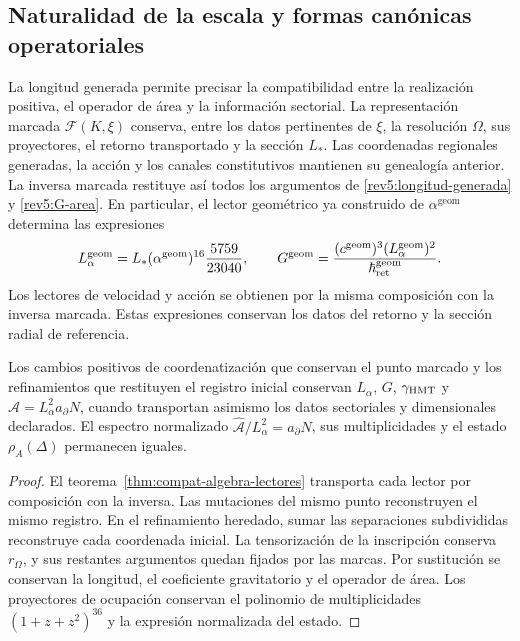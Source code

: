 \subsection{Naturalidad de la escala y formas canónicas operatoriales}
\label{rev5:naturalidad-areal}

La longitud generada permite precisar la compatibilidad entre la
realización positiva, el operador de área y la información sectorial.
La representación marcada \(\mathcal F(K,\xi)\) conserva,
entre los datos pertinentes de \(\xi\), la resolución
\(\Omega\), sus proyectores, el retorno transportado y la sección
\(L_*\). Las coordenadas regionales generadas, la acción y los canales
constitutivos mantienen su genealogía anterior. La inversa marcada
restituye así todos los argumentos de
\eqref{rev5:longitud-generada} y \eqref{rev5:G-area}.
En particular, el lector geométrico ya construido de
\(\alpha^{\mathrm{geom}}\) determina las expresiones
\[
 L_\alpha^{\mathrm{geom}}
 =L_*(\alpha^{\mathrm{geom}})^{16}\frac{5759}{23040},
 \qquad
 G^{\mathrm{geom}}
 =\frac{(c^{\mathrm{geom}})^3
 (L_\alpha^{\mathrm{geom}})^2}{\hbar_{\rm ret}^{\mathrm{geom}}}.
\]
Los lectores de velocidad y acción se obtienen por la misma
composición con la inversa marcada. Estas expresiones conservan
los datos del retorno y la sección radial de referencia.

\begin{corollary}
\label{rev5:conservacion}
Los cambios positivos de coordenatización que conservan el punto marcado y los
refinamientos que restituyen el registro inicial conservan
\(L_\alpha\), \(G\), \(\gamma_{\rm HMT}\) y
\(\widehat{\mathcal A}=L_\alpha^2a_\partial N\), cuando
transportan asimismo los datos sectoriales y dimensionales declarados.
El espectro normalizado
\(\widehat{\mathcal A}/L_\alpha^2=a_\partial N\), sus
multiplicidades y el estado \(\rho_A(\Delta)\) permanecen iguales.
\end{corollary}
\begin{proof}
El teorema~\ref{thm:compat-algebra-lectores} transporta cada lector
por composición con la inversa. Las mutaciones del mismo punto
reconstruyen el mismo registro. En el refinamiento heredado, sumar
las separaciones subdivididas reconstruye cada coordenada inicial.
La tensorización de la inscripción conserva \(r_\Omega\),
y sus restantes argumentos quedan fijados por las marcas. Por
sustitución se conservan la longitud, el coeficiente gravitatorio y
el operador de área. Los proyectores de ocupación conservan el
polinomio de multiplicidades \((1+z+z^2)^{36}\) y la expresión
normalizada del estado.
\end{proof}

